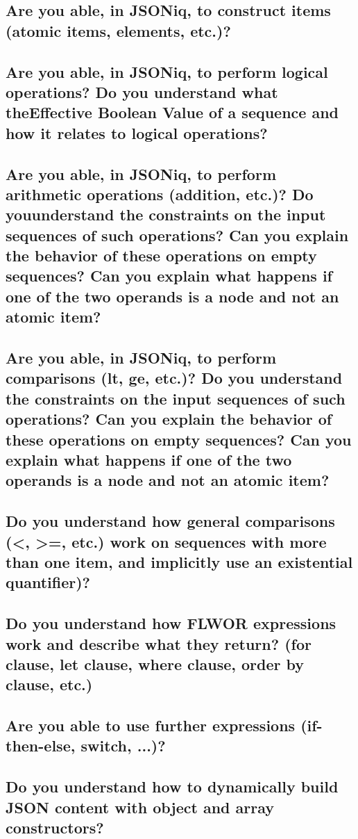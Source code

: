 \documentclass{article}
\begin{document}
\subsection{Are you able, in JSONiq, to construct items (atomic items, elements, etc.)?}
\subsection{Are you able, in JSONiq, to perform logical operations? Do you understand what theEffective Boolean Value of a sequence and how it relates to logical operations?}
\subsection{Are you able, in JSONiq, to perform arithmetic operations (addition, etc.)? Do youunderstand the constraints on the input sequences of such operations? Can you explain the behavior of these operations on empty sequences? Can you explain what happens if one of the two operands is a node and not an atomic item?}
\subsection{Are you able, in JSONiq, to perform comparisons (lt, ge, etc.)? Do you understand the constraints on the input sequences of such operations? Can you explain the behavior of these operations on empty sequences? Can you explain what happens if one of the two operands is a node and not an atomic item?}
\subsection{Do you understand how general comparisons (<, >=, etc.) work on sequences with more than one item, and implicitly use an existential quantifier)?}
\subsection{Do you understand how FLWOR expressions work and describe what they return? (for clause, let clause, where clause, order by clause, etc.)}
\subsection{Are you able to use further expressions (if-then-else, switch, ...)?}
\subsection{Do you understand how to dynamically build JSON content with object and array constructors?}
\end{document}
